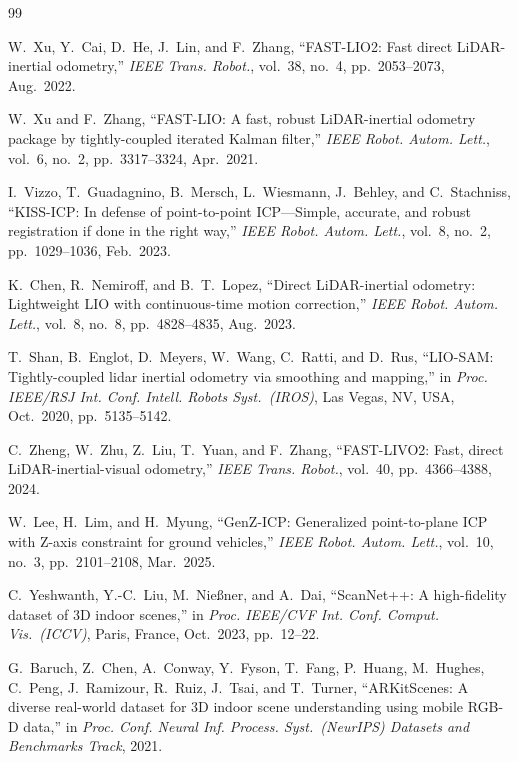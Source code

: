 \begin{thebibliography}{99}

W.~Xu, Y.~Cai, D.~He, J.~Lin, and F.~Zhang,
``FAST-LIO2: Fast direct LiDAR-inertial odometry,''
\textit{IEEE Trans. Robot.}, vol.~38, no.~4, pp.~2053--2073, Aug.~2022.

W.~Xu and F.~Zhang,
``FAST-LIO: A fast, robust LiDAR-inertial odometry package by tightly-coupled iterated Kalman filter,''
\textit{IEEE Robot. Autom. Lett.}, vol.~6, no.~2, pp.~3317--3324, Apr.~2021.

I.~Vizzo, T.~Guadagnino, B.~Mersch, L.~Wiesmann, J.~Behley, and C.~Stachniss,
``KISS-ICP: In defense of point-to-point ICP---Simple, accurate, and robust registration if done in the right way,''
\textit{IEEE Robot. Autom. Lett.}, vol.~8, no.~2, pp.~1029--1036, Feb.~2023.

K.~Chen, R.~Nemiroff, and B.~T.~Lopez,
``Direct LiDAR-inertial odometry: Lightweight LIO with continuous-time motion correction,''
\textit{IEEE Robot. Autom. Lett.}, vol.~8, no.~8, pp.~4828--4835, Aug.~2023.

T.~Shan, B.~Englot, D.~Meyers, W.~Wang, C.~Ratti, and D.~Rus,
``LIO-SAM: Tightly-coupled lidar inertial odometry via smoothing and mapping,''
in \textit{Proc. IEEE/RSJ Int. Conf. Intell. Robots Syst.\ (IROS)}, Las Vegas, NV, USA, Oct.~2020, pp.~5135--5142.

C.~Zheng, W.~Zhu, Z.~Liu, T.~Yuan, and F.~Zhang,
``FAST-LIVO2: Fast, direct LiDAR-inertial-visual odometry,''
\textit{IEEE Trans. Robot.}, vol.~40, pp.~4366--4388, 2024.

W.~Lee, H.~Lim, and H.~Myung,
``GenZ-ICP: Generalized point-to-plane ICP with Z-axis constraint for ground vehicles,''
\textit{IEEE Robot. Autom. Lett.}, vol.~10, no.~3, pp.~2101--2108, Mar.~2025.

C.~Yeshwanth, Y.-C.~Liu, M.~Nie{\ss}ner, and A.~Dai,
``ScanNet++: A high-fidelity dataset of 3D indoor scenes,''
in \textit{Proc. IEEE/CVF Int. Conf. Comput. Vis.\ (ICCV)}, Paris, France, Oct.~2023, pp.~12--22.

G.~Baruch, Z.~Chen, A.~Conway, Y.~Fyson, T.~Fang, P.~Huang, M.~Hughes, C.~Peng, J.~Ramizour, R.~Ruiz, J.~Tsai, and T.~Turner,
``ARKitScenes: A diverse real-world dataset for 3D indoor scene understanding using mobile RGB-D data,''
in \textit{Proc. Conf. Neural Inf. Process. Syst.\ (NeurIPS) Datasets and Benchmarks Track}, 2021.


\end{thebibliography}
